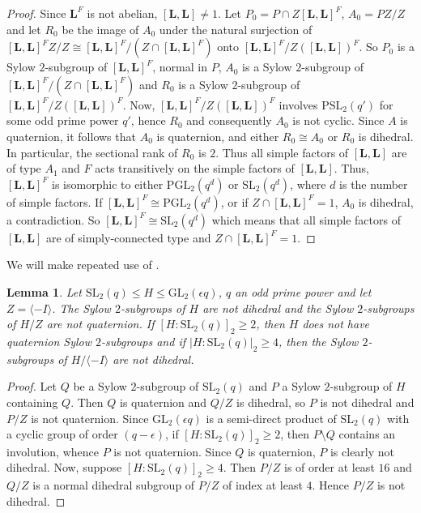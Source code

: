 \documentclass{amsart}
\theoremstyle{plain}\newtheorem{Theorem}{Theorem}[section]
\theoremstyle{plain}\newtheorem{Conjecture}[Theorem]{Conjecture}
\theoremstyle{plain}\newtheorem{Corollary}[Theorem]{Corollary}
\theoremstyle{plain}\newtheorem{Lemma}[Theorem]{Lemma}
\theoremstyle{plain}\newtheorem{Proposition}[Theorem]{Proposition}
\theoremstyle{definition}\newtheorem{Definition}[Theorem]{Definition}
\theoremstyle{definition}\newtheorem{Example}[Theorem]{Example}
\theoremstyle{definition}\newtheorem{Examples}[Theorem]{Examples}
\theoremstyle{definition}\newtheorem{Exercise}[Theorem]{Exercise}
\theoremstyle{definition}\newtheorem{Notation}[Theorem]{Notation}
\theoremstyle{definition}\newtheorem{Remark}[Theorem]{Remark}
\theoremstyle{definition}\newtheorem{Remarks}[Theorem]{Remarks}
\def\GL{\mathrm{GL}}
\def\PGL{\mathrm{PGL}}
\def\PSL{\mathrm{PSL}}
\def\SL{\mathrm{SL}}
\newcommand{\bL}{{\mathbf{L}}}
\numberwithin{equation}{section}
\begin{document}
\begin{proof} Since $\bL^F$ is  not abelian,  $[\bL, \bL] \ne 1 $. Let  $P_0 =  P \cap  Z[\bL, \bL]^F $,
 $A_0 =  PZ/Z$  and let   $R_0$ be the image of $A_0$  under the natural surjection of  $[\bL, \bL]^FZ/Z \cong [\bL, \bL]^F/ (Z \cap [\bL, \bL]^F) $  onto  $[\bL, \bL]^F/  Z([\bL, \bL])^F$.  So  $P_0$ is a Sylow $2$-subgroup of  $[\bL, \bL]^F$, normal in $P$, $A_0$ is  a Sylow $2$-subgroup of  $[\bL, \bL]^F/ (Z \cap [\bL, \bL]^F) $   and $R_0$ is a  Sylow $2$-subgroup of $[\bL, \bL]^F/  Z([\bL, \bL])^F$.    Now, $[\bL, \bL]^F/  Z([\bL, \bL])^F$  involves $\PSL_2(q')$  for some odd prime power $q'$, hence $R_0$  and consequently $A_0$ is  not cyclic. Since  $A$ is  quaternion, it follows that  $A_0$ is  quaternion, and  either $R_0 \cong A_0$  or $R_0$  is  dihedral.   In particular, the sectional rank of $R_0$ is $2$.   Thus  all simple factors of $[\bL, \bL]$ are of type $A_1 $  and   $F$ acts transitively  on   the simple factors  of $[\bL, \bL]$.   Thus,   $[\bL, \bL]^F$  is isomorphic to either $\PGL_2(q^d)$  or  $\SL_2 (q^d)$, where $d$ is  the number of simple factors. 
 If $ [\bL, \bL]^F \cong \PGL_2(q^d)$,  or if $Z \cap [\bL, \bL]^F =1 $,   $A_0$  is dihedral,  a  contradiction.  So $ [\bL, \bL]^F \cong \SL_2(q^d)$ which means that all simple factors of $[\bL, \bL]$ are of simply-connected type  and  $Z \cap [\bL, \bL]^F =1 $.
\end{proof}
\fi
We will make repeated use of . 

\begin{Lemma} \label{lem:inbetween}  Let $\SL_2(q) \leq  H \leq  \GL_2(\epsilon q) $, $q$ an odd prime power and let $Z =\langle -I \rangle$. The Sylow  $2$-subgroups  of $H$ are not dihedral and  the Sylow $2$-subgroups of  $H/Z$ are  not quaternion.
If $[H: \SL_2 (q)]_2 \geq 2 $, then $H$ does not have quaternion  Sylow $2$-subgroups  and if   $|H: \SL_2 (q)|_2 \geq 4 $,  then  the  Sylow $2$-subgroups of  $H/\langle -I \rangle $    are not  dihedral.
\end{Lemma}
\begin{proof}   Let $Q$    be a   Sylow $2$-subgroup of  $\SL_2(q) $  and $P$ a Sylow $2$-subgroup of $H$ containing $Q$.  Then   $Q$ is quaternion and  $Q/Z$ is dihedral, so $P$  is not dihedral and $P/Z$ is not quaternion.  
Since  $\GL_2(\epsilon q) $ is a semi-direct product of  $\SL_2(q)$  with  a cyclic group of order  $(q-\epsilon) $, if $[H: \SL_2 (q)]_2 \geq 2 $, then  $P\setminus Q$ contains an involution, whence $P$ is not quaternion.  Since $Q$ is quaternion, $P$ is clearly not dihedral.   Now,   suppose $[H: \SL_2 (q)]_2 \geq 4 $.  Then  $P/Z$ is   of order at least  $16$ and  $Q/Z$ is a normal dihedral  subgroup of  $P/Z$  of   index at least $4$. Hence $P/Z$ is not dihedral.
\end{proof}
\end{document}

